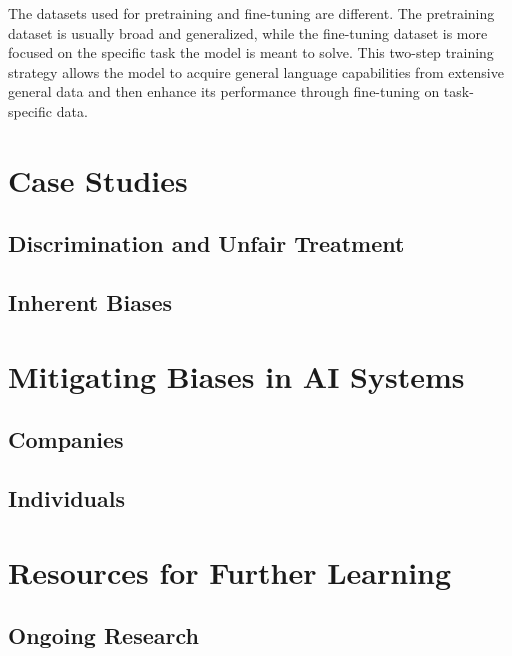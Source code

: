 \documentclass[
]{book}
\begin{document}
The datasets used for pretraining and fine-tuning are different. The
pretraining dataset is usually broad and generalized, while the fine-tuning dataset is more focused on the specific task the model is meant to solve. This two-step training strategy allows the model to acquire general language capabilities from extensive general data and then enhance its performance through fine-tuning on task-specific data.

\hypertarget{case-studies}{%
\chapter{Case Studies}\label{case-studies}}

\hypertarget{discrimination-and-unfair-treatment}{%
\section{Discrimination and Unfair Treatment}\label{discrimination-and-unfair-treatment}}

\hypertarget{inherent-biases}{%
\section{Inherent Biases}\label{inherent-biases}}

\hypertarget{mitigating-biases-in-ai-systems}{%
\chapter{Mitigating Biases in AI Systems}\label{mitigating-biases-in-ai-systems}}

\hypertarget{companies}{%
\section{Companies}\label{companies}}

\hypertarget{individuals}{%
\section{Individuals}\label{individuals}}

\hypertarget{resources-for-further-learning}{%
\chapter{Resources for Further Learning}\label{resources-for-further-learning}}

\hypertarget{ongoing-research}{%
\section{Ongoing Research}\label{ongoing-research}}
\end{document}
